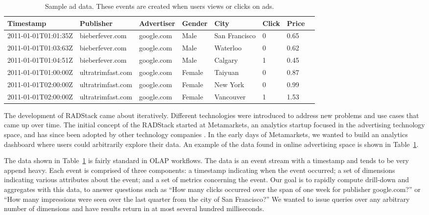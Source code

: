 \documentclass{vldb}
\begin{document}
\begin{table}
\centering
\begin{tabular}{| l | l | l | l | l | l | l | l |}
  \hline
  \textbf{Timestamp} & \textbf{Publisher} & \textbf{Advertiser} & \textbf{Gender} & \textbf{City} & \textbf{Click} & \textbf{Price} \\ \hline
  2011-01-01T01:01:35Z & bieberfever.com & google.com & Male & San Francisco & 0 & 0.65 \\ \hline
  2011-01-01T01:03:63Z & bieberfever.com & google.com & Male & Waterloo & 0 & 0.62 \\ \hline
  2011-01-01T01:04:51Z & bieberfever.com & google.com & Male & Calgary & 1 & 0.45 \\ \hline
  2011-01-01T01:00:00Z & ultratrimfast.com & google.com & Female & Taiyuan & 0 & 0.87 \\ \hline
  2011-01-01T02:00:00Z & ultratrimfast.com & google.com & Female & New York & 0 & 0.99 \\ \hline
  2011-01-01T02:00:00Z & ultratrimfast.com & google.com & Female & Vancouver & 1 & 1.53 \\ \hline
\end{tabular}
\caption{Sample ad data. These events are created when users views or clicks on ads.}
\label{tab:sample_data}
\end{table}

The development of RADStack came about iteratively. Different technologies were
introduced to address new problems and use cases that came up over time.
The initial concept of the RADStack started at Metamarkets, an analytics
startup focused in the advertising technology space, and has since been adopted
by other technology companies \cite{2014yahoo}. In the early days of Metamarkets, we wanted
to build an analytics dashboard where users could arbitrarily explore their
data. An example of the data found in online advertising space is shown in
Table~\ref{tab:sample_data}. 

The data shown in Table~\ref{tab:sample_data} is fairly standard in OLAP
workflows. The data is an event stream with a timestamp and tends to be very
append heavy. Each event is comprised of three components: a timestamp
indicating when the event occurred; a set of dimensions indicating various
attributes about the event; and a set of metrics concerning the event. Our goal
is to rapidly compute drill-down and aggregates with this data, to answer
questions such as “How many clicks occurred over the span of one week for
publisher google.com?” or “How many impressions were seen over the last quarter
from the city of San Francisco?” We wanted to issue queries over any arbitrary
number of dimensions and have results return in at most several hundred
milliseconds.
\end{document}
